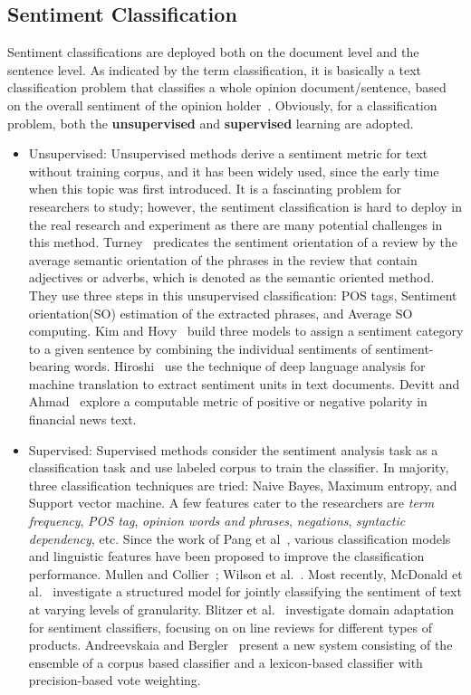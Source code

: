 \documentclass[12pt]{article}
\begin{document}
\subsection{Sentiment Classification}
Sentiment classifications are deployed both on the document level and the sentence level. As indicated by the term classification, it is basically a text classification problem that classifies a whole opinion document/sentence, based on the overall sentiment of the opinion holder~\cite{turney2002thumbs, pang2002thumbs}. Obviously, for a classification problem, both the \textbf{unsupervised} and \textbf{supervised} learning are adopted. 
\begin{itemize}
\item Unsupervised: Unsupervised methods derive a sentiment metric for text without training corpus, and it has been widely used, since the early time when this topic was first introduced. It is a fascinating problem for researchers to study; however, the sentiment classification is hard to deploy in the real research and experiment as there are many potential challenges in this method. Turney~\cite{turney2002thumbs} predicates the sentiment orientation of
a review by the average semantic orientation of the
phrases in the review that contain adjectives or
adverbs, which is denoted as the semantic oriented
method. They use three steps in this unsupervised classification: POS tags, Sentiment orientation(SO) estimation of the extracted phrases, and Average SO computing. Kim and Hovy~\cite{kim2004determining} build three models
to assign a sentiment category to a given sentence
by combining the individual sentiments of sentiment-
bearing words. Hiroshi~\cite{hiroshi2004deeper} use the technique of deep language analysis for machine
translation to extract sentiment units in text documents. Devitt and Ahmad~\cite{devitt2007sentiment} explore a
computable metric of positive or negative polarity
in financial news text.
\item Supervised: Supervised methods consider the sentiment analysis task as a classification task and use labeled corpus to train the classifier. In majority, three classification techniques are tried: Naive Bayes, Maximum entropy, and Support vector machine. A few features cater to the researchers are \emph{term frequency}, \emph{POS tag}, \emph{opinion words and phrases}, \emph{negations}, \emph{syntactic dependency}, etc. Since the work of Pang et al~\cite{pang2002thumbs}, various classification models
and linguistic features have been proposed to improve
the classification performance. Mullen and Collier~\cite{mullen2004sentiment}; Wilson et al.~\cite{wilson2005recognizing}. Most recently, McDonald et al.~\cite{titov2008joint} investigate a structured model for jointly
classifying the sentiment of text at varying levels
of granularity. Blitzer et al.~\cite{blitzer2007biographies} investigate domain
adaptation for sentiment classifiers, focusing
on on line reviews for different types of products.
Andreevskaia and Bergler~\cite{andreevskaia2007clac} present a new
system consisting of the ensemble of a corpus based
classifier and a lexicon-based classifier with
precision-based vote weighting.


\end{itemize}
\end{document}
